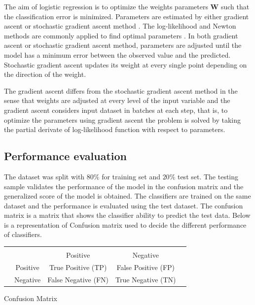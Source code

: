 \documentclass[final,5p,times,twocolumn,authoryear]{elsarticle}
\begin{document}
The aim of logistic regression is to optimize the weights parameters $\textbf{W}$ such that the classification error is minimized. Parameters are estimated by either gradient ascent or stochastic gradient ascent method \cite{bonaccorso2017machine}. The log-likelihood and Newton methods are commonly applied to find optimal parameters \cite{qi1993nonsmooth}. In both gradient ascent or stochastic gradient ascent method, parameters are adjusted until the model has a minimum error between the observed value and the predicted. Stochastic gradient ascent updates its weight at every single point depending on the direction of the weight.

The gradient ascent  differs from the stochastic gradient ascent method in the sense that weights are adjusted at every level of the input variable and the gradient ascent considers  input dataset in batches at each step, that is, to optimize the parameters using gradient ascent the problem is solved by  taking the partial derivate of log-likelihood  function with respect to parameters. 
 

\subsection{Performance evaluation}
 The dataset was split with $80\% $ for training set and $20\%$ test set. The testing sample validates the performance of the model in the confusion matrix and the generalized score of the model is obtained. The classifiers are trained on the same dataset and the performance is evaluated using the test dataset. The confusion matrix is a  matrix that shows the classifier ability to predict the test data. Below is a representation of Confusion matrix used to decide the different performance of classifiers. 

	
	\begin{tabular}{c|c|c|c|c}
		
		\multicolumn{2}{c}{}&\multicolumn{2}{c}{}&\\
		\cline{3-4}
		\multicolumn{2}{c|}{}&Positive&Negative&\multicolumn{1}{c}{}\\
		\cline{2-4}
		\multirow{2}{*}{}& Positive & True Positive (TP) &False Positive (FP) & \\
		\cline{2-4}
		& Negative & False Negative (FN) & True Negative (TN) & \\
		\cline{2-4}
		 
	\end{tabular}
	\captionsetup{type=table} 
	\caption{Confusion Matrix }
	\label{tab}
\end{document}
